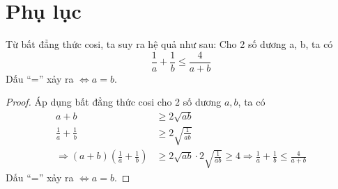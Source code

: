 \chapter*{Phụ lục}
\setcounter{chapter}{5}
\begin{hq_nonumber}\label{hq1}
	Từ bất đẳng thức cosi, ta suy ra hệ quả như sau: Cho 2 số dương a, b, ta có
	\begin{equation}
		\frac{1}{a}+\frac{1}{b}\leq \frac{4}{a+b}
	\end{equation}
	Dấu ``='' xảy ra $\Leftrightarrow a=b$.
\end{hq_nonumber}
\begin{proof}
	Áp dụng bất đẳng thức cosi cho 2 số dương $a, b$, ta có
	\begin{align*}
		a+b&\geq 2\sqrt{ab}\\
		\frac{1}{a}+\frac{1}{b}&\geq 2\sqrt{\frac{1}{ab}}\\
		\Rightarrow (a+b)\left(\frac{1}{a}+\frac{1}{b}\right)&\geq 2\sqrt{ab}\cdot 2\sqrt{\frac{1}{ab}}\geq 4\Rightarrow \frac{1}{a}+\frac{1}{b}\leq \frac{4}{a+b}
	\end{align*}
	Dấu ``='' xảy ra $\Leftrightarrow a=b$.
\end{proof}
